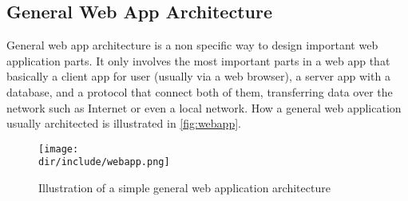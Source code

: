 \subsection{General Web App Architecture}
\label{ssec:general-webapp-arch}

General web app architecture is a non specific way to design important web application parts.
It only involves the most important parts in a web app that basically a client app for user (usually via a web browser), a server app with a database, and a protocol that connect both of them, transferring data over the network such as Internet or even a local network.
How a general web application usually architected is illustrated in \autoref{fig:webapp}.

\begin{figure}[htbp]
    \centering
    \texttt{[image: \\dir/include/webapp.png]}
    \caption[General Web Application Architecture]{Illustration of a simple general web application architecture}
    \label{fig:webapp}
\end{figure}
